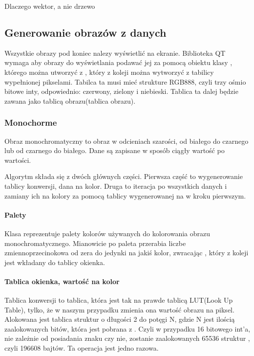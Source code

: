 Dlaczego wektor, a nie drzewo

\subsection{Generowanie obrazów z danych}

Wszystkie obrazy pod koniec nalezy wyświetlić na ekranie. 
Biblioteka QT wymaga aby obrazy do wyświetlania podawać jej za pomocą obiektu klasy , którego można utworzyć z , który z koleji można wytworzyć z tabilicy wypełnionej pikselami.
Tabilca ta musi mieć strukture RGB888, czyli trzy ośmio bitowe inty, odpowiednio: czerwony, zielony i niebieski.
Tablica ta dalej będzie zawana jako tablicą obrazu(tablica obrazu).

\subsubsection{Monochorme}

Obraz monochromatyczny to obraz w odcieniach szarości, od białego do czarnego lub od czarnego do białego. Dane są zapisane w sposób ciągły wartość po wartości.


Algorytm składa się z dwóch głównych części.
Pierwsza część to wygenerowanie tablicy konwersji, dana na kolor.
Druga to iteracja po wszystkich danych i zamiany ich na kolory za pomocą tablicy wygenerowanej na w kroku pierwszym.


\paragraph{Palety} 
Klasa  reprezentuje palety kolorów używanych do kolorowania obrazu monochromatycznego.
Mianowicie po paleta przerabia liczbe zmiennoprzecinokowa od zera do jedynki na jakiś kolor, zwracając , który z koleji jest wkładany do tablicy okienka.

\paragraph{Tablica okienka, wartość na kolor}

Tablica konwersji to tablica, która jest tak na prawde tablicą LUT(Look Up Table), tylko, że w naszym przypadku zmienia ona wartość obrazu na piksel.
Alokowana jest tablica struktur  o długości 2 do potęgi N, gdzie N jest ilością zaalokowanych bitów, która jest pobrana z .
Czyli w przypadku 16 bitowego int'a, nie zależnie od posiadania znaku czy nie, zostanie zaalokowanych 65536 struktur , czyli 196608 bajtów.
Ta operacja jest jedno razowa.

